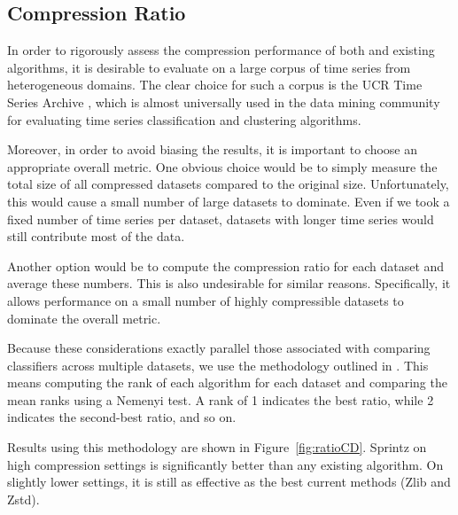 

\subsection{Compression Ratio}

In order to rigorously assess the compression performance of both \minesp and existing algorithms, it is desirable to evaluate on a large corpus of time series from heterogeneous domains. The clear choice for such a corpus is the UCR Time Series Archive \cite{ucrTimeSeries}, which is almost universally used in the data mining community for evaluating time series classification and clustering algorithms.

Moreover, in order to avoid biasing the results, it is important to choose an appropriate overall metric. One obvious choice would be to simply measure the total size of all compressed datasets compared to the original size. Unfortunately, this would cause a small number of large datasets to dominate. Even if we took a fixed number of time series per dataset, datasets with longer time series would still contribute most of the data.

Another option would be to compute the compression ratio for each dataset and average these numbers. This is also undesirable for similar reasons. Specifically, it allows performance on a small number of highly compressible datasets to dominate the overall metric.

Because these considerations exactly parallel those associated with comparing classifiers across multiple datasets, we use the methodology outlined in \cite{cdDiagrams}. This means computing the rank of each algorithm for each dataset and comparing the mean ranks using a Nemenyi test. A rank of 1 indicates the best ratio, while 2 indicates the second-best ratio, and so on.

Results using this methodology are shown in Figure~\ref{fig:ratioCD}. Sprintz on high compression settings is significantly better than any existing algorithm. On slightly lower settings, it is still as effective as the best current methods (Zlib and Zstd).

